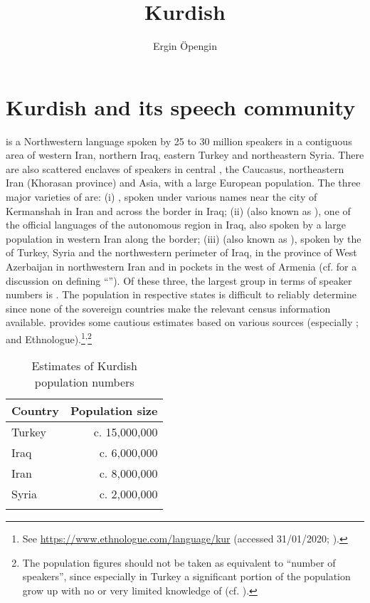 \documentclass[output=paper]{langsci/langscibook}
\author{Ergin Öpengin\affiliation{University of Kurdistan-Hewlêr}}
\title{Kurdish}
\begin{document}
\maketitle

\section{Kurdish and its speech community} 

 is a Northwestern  language spoken by 25 to 30 million speakers in a contiguous area of western Iran, northern Iraq, eastern Turkey and northeastern Syria. There are also scattered enclaves of  speakers in central , the Caucasus, northeastern Iran (Khorasan province) and  Asia, with a large European  population. The three major varieties of  are: (i)  , spoken under various names near the city of Kermanshah in Iran and across the border in Iraq; (ii)   (also known as ), one of the official languages of the autonomous  region in Iraq, also spoken by a large population in western Iran along the  border; (iii)   (also known as ), spoken by the  of Turkey, Syria and the northwestern perimeter of Iraq, in the province of West Azerbaijan in northwestern Iran and in pockets in the west of Armenia (cf. \citealt{HaigÖpengin2014} for a discussion on defining “”). Of these three, the largest group in terms of speaker numbers is  . The  population in respective states is difficult to reliably determine since none of the sovereign countries make the relevant census information available.  provides some cautious estimates based on various sources (especially \citealt{Sirkeci2005,ZeyneloğluEtAl2016}; and Ethnologue).\footnote{See \url{https://www.ethnologue.com/language/kur} (accessed 31/01/2020; \citealt{Ethnologue}).}\textsuperscript{,}\footnote{The population figures should not be taken as equivalent to “number of speakers”, since especially in Turkey a significant portion of the  population grow up with no or very limited knowledge of  (cf. \citealt{Öpengin2012,ZeyneloğluEtAl2016}).} 

\begin{table}
\begin{tabular}{lr}
\lsptoprule
Country & Population size\\\midrule
{Turkey} & c. 15,000,000\\
{Iraq}   & c. 6,000,000\\
{Iran}   & c. 8,000,000\\
{Syria}  & c. 2,000,000\\
\lspbottomrule
\end{tabular}
\caption{Estimates of Kurdish population numbers}
\label{tab:opengin:1}
\end{table}
\end{document}
